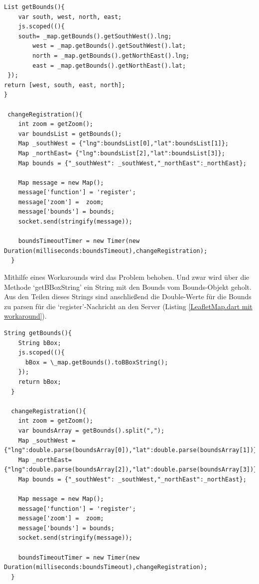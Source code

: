 \begin{lstlisting}[caption= LeafletMap.dart mit ursprünglicher Abfrage des Bounds-Objektes, label= LeafletMap.dart]
  List getBounds(){
    var south, west, north, east;
    js.scoped((){
    south= _map.getBounds().getSouthWest().lng;
        west = _map.getBounds().getSouthWest().lat;
        north = _map.getBounds().getNorthEast().lng;
        east = _map.getBounds().getNorthEast().lat;
 });
return [west, south, east, north];
}

 changeRegistration(){
    int zoom = getZoom();
    var boundsList = getBounds();
    Map _southWest = {"lng":boundsList[0],"lat":boundsList[1]};
    Map _northEast= {"lng":boundsList[2],"lat":boundsList[3]};
    Map bounds = {"_southWest": _southWest,"_northEast":_northEast};

    Map message = new Map();
    message['function'] = 'register';
    message['zoom'] =  zoom;
    message['bounds'] = bounds;
    socket.send(stringify(message));
    
    boundsTimeoutTimer = new Timer(new Duration(milliseconds:boundsTimeout),changeRegistration);  
  }
\end{lstlisting}
Mithilfe eines Workarounds wird das Problem behoben. Und zwar wird über die Methode ‘getBBoxString’ ein String mit den Bounds vom Bounds-Objekt geholt. Aus den Teilen dieses Strings sind anschließend die Double-Werte für die Bounds zu parsen für die ‘register’-Nachricht an den Server (Listing \ref{LeafletMap.dart mit workaround}).
\begin{lstlisting}[caption= LeafletMap.dart mit workaround über BBoxString, label= LeafletMap.dart mit workaround über BBoxString]
String getBounds(){
    String bBox;
    js.scoped((){
      bBox = \_map.getBounds().toBBoxString();
    });
    return bBox;
  }
  
  changeRegistration(){
    int zoom = getZoom();
    var boundsArray = getBounds().split(",");
    Map _southWest = {"lng":double.parse(boundsArray[0]),"lat":double.parse(boundsArray[1])};
    Map _northEast= {"lng":double.parse(boundsArray[2]),"lat":double.parse(boundsArray[3])};
    Map bounds = {"_southWest": _southWest,"_northEast":_northEast};

    Map message = new Map();
    message['function'] = 'register';
    message['zoom'] =  zoom;
    message['bounds'] = bounds;
    socket.send(stringify(message));
    
    boundsTimeoutTimer = new Timer(new Duration(milliseconds:boundsTimeout),changeRegistration);  
  }
\end{lstlisting}

